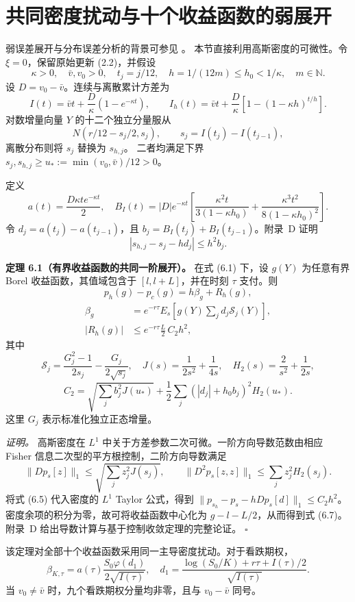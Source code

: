 \section{共同密度扰动与十个收益函数的弱展开}

弱误差展开与分布误差分析的背景可参见
\cite{TalayTubaro1990,MickelNeuenkirch2023,BallyTalay1996}。
本节直接利用高斯密度的可微性。令 \(\xi=0\)，保留原始更新 (2.2)，并假设
\[
\kappa>0,\quad \bar v,v_0>0,\quad
t_j=j/12,\quad h=1/(12m)\le h_0<1/\kappa,\quad m\in\mathbb N.
\tag{6.1}
\]
设 \(D=v_0-\bar v\)。连续与离散累计方差为
\[
I(t)=\bar vt+\frac D\kappa(1-e^{-\kappa t}),\qquad
I_h(t)=\bar vt+\frac D\kappa[1-(1-\kappa h)^{t/h}].
\tag{6.2}
\]
对数增量向量 \(Y\) 的十二个独立分量服从
\[
N(r/12-s_j/2,s_j),\qquad s_j=I(t_j)-I(t_{j-1}),
\tag{6.3}
\]
离散分布则将 \(s_j\) 替换为 \(s_{h,j}\)。
二者均满足下界
\(s_j,s_{h,j}\ge u_*:=\min(v_0,\bar v)/12>0\)。

定义
\[
a(t)=\frac{D\kappa t e^{-\kappa t}}2,
\quad
B_I(t)=|D|e^{-\kappa t}
\left[
\frac{\kappa^2t}{3(1-\kappa h_0)}
+\frac{\kappa^3t^2}{8(1-\kappa h_0)^2}
\right].
\tag{6.4}
\]
令 \(d_j=a(t_j)-a(t_{j-1})\)，且
\(b_j=B_I(t_j)+B_I(t_{j-1})\)。附录~D 证明
\[
|s_{h,j}-s_j-hd_j|\le h^2b_j.
\tag{6.5}
\]

\textbf{定理 6.1（有界收益函数的共同一阶展开）。}
在式 (6.1) 下，设 \(g(Y)\) 为任意有界 Borel 收益函数，其值域包含于
\([l,l+L]\)，并在时刻 \(\tau\) 支付。则
\[
p_h(g)-p_c(g)=h\beta_g+R_h(g),
\tag{6.6}
\]
\[
\begin{aligned}
\beta_g&=e^{-r\tau}E_s\!\left[g(Y)\sum_jd_j\mathcal S_j(Y)\right],\\
|R_h(g)|&\le e^{-r\tau}\frac L2\,C_2h^2,
\end{aligned}
\tag{6.7}
\]
其中
\[
\mathcal S_j=\frac{G_j^2-1}{2s_j}-\frac{G_j}{2\sqrt{s_j}},
\quad
J(s)=\frac1{2s^2}+\frac1{4s},\quad
H_2(s)=\frac2{s^2}+\frac1{2s},
\]
\[
C_2=
\sqrt{\sum_jb_j^2J(u_*)}
+\frac12\sum_j(|d_j|+h_0b_j)^2H_2(u_*).
\tag{6.8}
\]
这里 \(G_j\) 表示标准化独立正态增量。

\textit{证明。}
高斯密度在 \(L^1\) 中关于方差参数二次可微。一阶方向导数范数由相应 Fisher 信息二次型的平方根控制，二阶方向导数满足
\[
\|Dp_s[z]\|_1\le\sqrt{\sum_jz_j^2J(s_j)},\qquad
\|D^2p_s[z,z]\|_1\le\sum_jz_j^2H_2(s_j).
\]
将式 (6.5) 代入密度的 \(L^1\) Taylor 公式，得到
\(\|p_{s_h}-p_s-hDp_s[d]\|_1\le C_2h^2\)。
密度余项的积分为零，故可将收益函数中心化为
\(g-l-L/2\)，从而得到式 (6.7)。
附录~D 给出导数计算与基于控制收敛定理的完整论证。
\hfill\(\square\)

该定理对全部十个收益函数采用同一主导密度扰动。对于看跌期权，
\[
\beta_{K,\tau}
=a(\tau)\frac{S_0\varphi(d_1)}{2\sqrt{I(\tau)}},
\quad
d_1=\frac{\log(S_0/K)+r\tau+I(\tau)/2}{\sqrt{I(\tau)}}.
\tag{6.9}
\]
当 \(v_0\ne\bar v\) 时，九个看跌期权分量均非零，且与
\(v_0-\bar v\) 同号。

